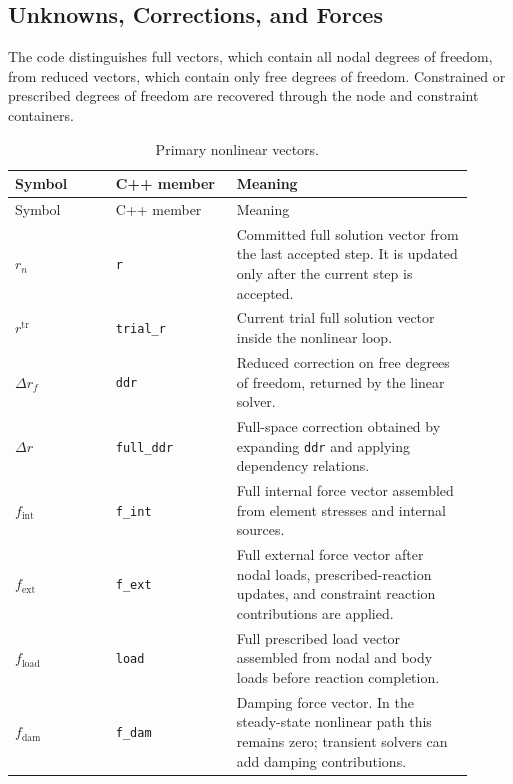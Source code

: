 \documentclass[11pt,a4paper]{article}
\newcommand{\code}[1]{\ifmmode\text{\texttt{\detokenize{#1}}}\else\nolinkurl{#1}\fi}
\begin{document}
\subsection{Unknowns, Corrections, and Forces}

The code distinguishes full vectors, which contain all nodal degrees of freedom,
from reduced vectors, which contain only free degrees of freedom.  Constrained
or prescribed degrees of freedom are recovered through the node and constraint
containers.

\begin{longtable}{p{0.20\linewidth} p{0.24\linewidth} p{0.47\linewidth}}
\caption{Primary nonlinear vectors.}
\label{tab:vector-notation}\\
\toprule
Symbol & C++ member & Meaning \\
\midrule
\endfirsthead
\toprule
Symbol & C++ member & Meaning \\
\midrule
\endhead
\(r_n\) & \code{r} &
Committed full solution vector from the last accepted step.  It is updated only
after the current step is accepted. \\

\(r^{\mathrm{tr}}\) & \code{trial_r} &
Current trial full solution vector inside the nonlinear loop. \\

\(\Delta r_f\) & \code{ddr} &
Reduced correction on free degrees of freedom, returned by the linear solver. \\

\(\Delta r\) & \code{full_ddr} &
Full-space correction obtained by expanding \code{ddr} and applying dependency
relations. \\

\(f_{\mathrm{int}}\) & \code{f_int} &
Full internal force vector assembled from element stresses and internal
sources. \\

\(f_{\mathrm{ext}}\) & \code{f_ext} &
Full external force vector after nodal loads, prescribed-reaction updates, and
constraint reaction contributions are applied. \\

\(f_{\mathrm{load}}\) & \code{load} &
Full prescribed load vector assembled from nodal and body loads before reaction
completion. \\

\(f_{\mathrm{dam}}\) & \code{f_dam} &
Damping force vector.  In the steady-state nonlinear path this remains zero;
transient solvers can add damping contributions. \\


\end{longtable}
\end{document}
